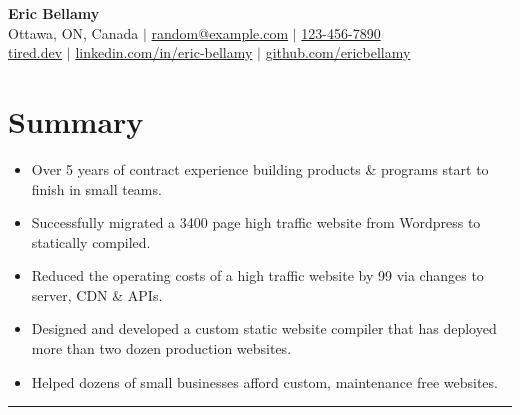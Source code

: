 \documentclass[letterpaper,10pt]{article}
\newcommand{\grayborder}[1][5pt]{%
    \vspace{#1}%
    {\color{lightgray}\hrule}%
}
\begin{document}
\begin{flushleft}
	\textbf{\Huge Eric Bellamy} \\
	\small
	 Ottawa, ON, Canada $|$
	 \href{random@example.com}{random@example.com} $|$
	 \href{tel:123-456-7890}{123-456-7890} \\[4pt]
	 \href{https://tired.dev}{tired.dev} $|$
	 \href{https://linkedin.com/in/eric-bellamy}{linkedin.com/in/eric-bellamy} $|$
	 \href{https://github.com/ericbellamy}{github.com/ericbellamy}
\end{flushleft}

\section*{Summary}
\begin{itemize}
    \item Over 5 years of contract experience building products \& programs start to finish in small teams.
    \item Successfully migrated a 3400 page high traffic website from Wordpress to statically compiled.
    \item Reduced the operating costs of a high traffic website by 99 via changes to server, CDN \& APIs.
    \item Designed and developed a custom static website compiler that has deployed more than two dozen production websites.
	\item Helped dozens of small businesses afford custom, maintenance free websites.
\end{itemize}
\grayborder
\end{document}
